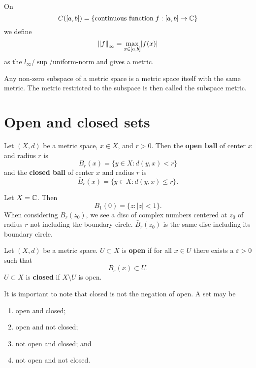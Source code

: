 \begin{example}
    On
    \[ C([a, b]) = \{ \text{continuous function}\; f : [a,b] \to \mathbb{C} \} \]
    we define
    \[ \left\lVert f\right\rVert_\infty = \max_{x \in [a,b]} \lvert f(x) \rvert \]
    as the $l_\infty$/$\sup$/uniform-norm and gives a metric.
\end{example}

\begin{proposition}
    Any non-zero subspace of a metric space is a metric space itself with the same metric. The metric restricted to the subspace is then called the subspace metric.
\end{proposition}

\section{Open and closed sets}

\begin{definition}
    Let $(X, d)$ be a metric space, $x \in X$, and $r > 0$. Then the \textbf{open ball} of center $x$ and radius $r$ is
    \[ B_r(x) = \{ y \in X : d(y, x) < r \} \]
    and the \textbf{closed ball} of center $x$ and radius $r$ is
    \[ \bar B_r(x) = \{ y \in X : d(y, x) \leq r \}. \]
\end{definition}

\begin{example}
    Let $X = \mathbb{C}$. Then
    \[ B_1(0) = \{ z : \lvert z \rvert < 1 \}. \]
    When considering $B_r(z_0)$, we see a disc of complex numbers centered at $z_0$ of radius $r$ not including the boundary circle. $\bar B_r(z_0)$ is the same disc including its boundary circle.
\end{example}

\begin{definition}
    Let $(X, d)$ be a metric space. $U \subset X$ is \textbf{open} if for all $x \in U$ there exists a $\varepsilon > 0$ such that \[ B_\varepsilon(x) \subset U. \] $U \subset X$ is \textbf{closed} if $X \setminus U$ is open.
\end{definition}

\begin{remark}
    It is important to note that closed is not the negation of open. A set may be
    \begin{enumerate}
        \item open and closed;
        \item open and not closed;
        \item not open and closed; and
        \item not open and not closed.
    \end{enumerate}
\end{remark}
